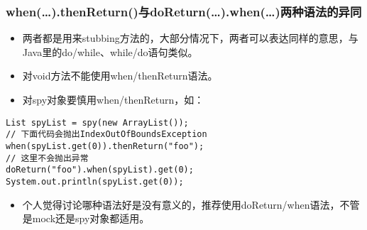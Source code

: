 \documentclass[9pt, b5paper]{article}
\begin{document}
\subsubsection{when(\ldots{}).thenReturn()与doReturn(\ldots{}).when(\ldots{})两种语法的异同}
\label{sec-1-2-3}
\begin{itemize}
\item 两者都是用来stubbing方法的，大部分情况下，两者可以表达同样的意思，与Java里的do/while、while/do语句类似。
\item 对void方法不能使用when/thenReturn语法。
\item 对spy对象要慎用when/thenReturn，如：
\end{itemize}
\begin{verbatim}
List spyList = spy(new ArrayList());
// 下面代码会抛出IndexOutOfBoundsException
when(spyList.get(0)).thenReturn("foo");
// 这里不会抛出异常
doReturn("foo").when(spyList).get(0);
System.out.println(spyList.get(0));
\end{verbatim}
\begin{itemize}
\item 个人觉得讨论哪种语法好是没有意义的，推荐使用doReturn/when语法，不管是mock还是spy对象都适用。
\end{itemize}
\end{document}
